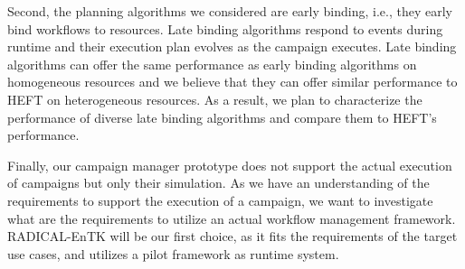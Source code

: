 Second, the planning algorithms we considered are early binding, i.e., they
early bind workflows to resources. Late binding algorithms respond to events
during runtime and their execution plan evolves as the campaign executes. Late
binding algorithms can offer the same performance as early binding algorithms on
homogeneous resources and we believe that they can offer similar performance to
HEFT on heterogeneous resources. As a result, we plan to characterize the
performance of diverse late binding algorithms and compare them to HEFT's
performance.

Finally, our campaign manager prototype does not support the actual execution of
campaigns but only their simulation. As we have an understanding of the
requirements to support the execution of a campaign, we want to investigate what
are the requirements to utilize an actual workflow management framework.
RADICAL-EnTK will be our first choice, as it fits the requirements of the target
use cases, and utilizes a pilot framework as runtime system.
